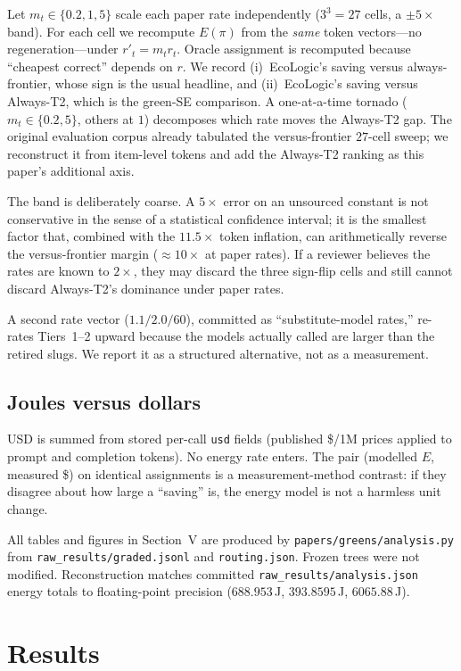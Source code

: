 \documentclass[10pt,conference]{IEEEtran}
\begin{document}
Let $m_t\in\{0.2,1,5\}$ scale each paper rate independently ($3^3=27$ cells, a $\pm5\times$ band). For each cell we recompute $E(\pi)$ from the \emph{same} token vectors---no regeneration---under $r'_t=m_t r_t$. Oracle assignment is recomputed because ``cheapest correct'' depends on $r$. We record (i)~EcoLogic's saving versus always-frontier, whose sign is the usual headline, and (ii)~EcoLogic's saving versus Always-T2, which is the green-SE comparison. A one-at-a-time tornado ($m_t\in\{0.2,5\}$, others at $1$) decomposes which rate moves the Always-T2 gap. The original evaluation corpus already tabulated the versus-frontier $27$-cell sweep; we reconstruct it from item-level tokens and add the Always-T2 ranking as this paper's additional axis.

The band is deliberately coarse. A $5\times$ error on an unsourced constant is not conservative in the sense of a statistical confidence interval; it is the smallest factor that, combined with the $11.5\times$ token inflation, can arithmetically reverse the versus-frontier margin ($\approx 10\times$ at paper rates). If a reviewer believes the rates are known to $2\times$, they may discard the three sign-flip cells and still cannot discard Always-T2's dominance under paper rates.

A second rate vector ($1.1/2.0/60$), committed as ``substitute-model rates,'' re-rates Tiers~1--2 upward because the models actually called are larger than the retired slugs. We report it as a structured alternative, not as a measurement.

\subsection{Joules versus dollars}

USD is summed from stored per-call \texttt{usd} fields (published \$/1M prices applied to prompt and completion tokens). No energy rate enters. The pair (modelled $E$, measured \$) on identical assignments is a measurement-method contrast: if they disagree about how large a ``saving'' is, the energy model is not a harmless unit change.

All tables and figures in Section~V are produced by \texttt{papers/greens/analysis.py} from \texttt{raw\_results/graded.jsonl} and \texttt{routing.json}. Frozen trees were not modified. Reconstruction matches committed \texttt{raw\_results/analysis.json} energy totals to floating-point precision ($688.953$\,J, $393.8595$\,J, $6065.88$\,J).

\section{Results}
\end{document}
